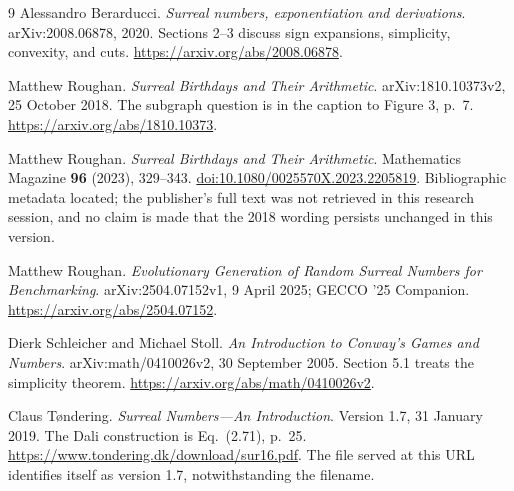\documentclass[11pt,a4paper]{article}
\numberwithin{equation}{section}
\theoremstyle{definition}
\theoremstyle{remark}
\begin{document}
\begin{thebibliography}{9}
Alessandro Berarducci.
\newblock \emph{Surreal numbers, exponentiation and derivations}.
\newblock arXiv:2008.06878, 2020.
\newblock Sections 2--3 discuss sign expansions, simplicity, convexity, and cuts.
\newblock \url{https://arxiv.org/abs/2008.06878}.

Matthew Roughan.
\newblock \emph{Surreal Birthdays and Their Arithmetic}.
\newblock arXiv:1810.10373v2, 25 October 2018.
\newblock The subgraph question is in the caption to Figure 3, p.~7.
\newblock \url{https://arxiv.org/abs/1810.10373}.

Matthew Roughan.
\newblock \emph{Surreal Birthdays and Their Arithmetic}.
\newblock Mathematics Magazine \textbf{96} (2023), 329--343.
\newblock \href{https://doi.org/10.1080/0025570X.2023.2205819}
 {doi:10.1080/0025570X.2023.2205819}.
\newblock Bibliographic metadata located; the publisher's full text was not
retrieved in this research session, and no claim is made that the 2018 wording
persists unchanged in this version.

Matthew Roughan.
\newblock \emph{Evolutionary Generation of Random Surreal Numbers for Benchmarking}.
\newblock arXiv:2504.07152v1, 9 April 2025; GECCO '25 Companion.
\newblock \url{https://arxiv.org/abs/2504.07152}.

Dierk Schleicher and Michael Stoll.
\newblock \emph{An Introduction to Conway's Games and Numbers}.
\newblock arXiv:math/0410026v2, 30 September 2005.
\newblock Section 5.1 treats the simplicity theorem.
\newblock \url{https://arxiv.org/abs/math/0410026v2}.

Claus T{\o}ndering.
\newblock \emph{Surreal Numbers---An Introduction}.
\newblock Version 1.7, 31 January 2019.
\newblock The Dali construction is Eq.~(2.71), p.~25.
\newblock \url{https://www.tondering.dk/download/sur16.pdf}.
\newblock The file served at this URL identifies itself as version 1.7,
notwithstanding the filename.
\end{thebibliography}
\end{document}

